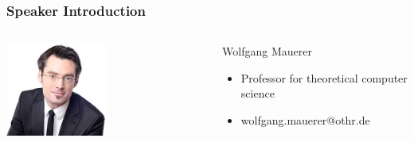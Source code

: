 \documentclass{beamer}
\begin{document}
	\begin{frame}
	\frametitle{Speaker Introduction}
	\begin{minipage}[c]{1.0\linewidth}
		\begin{columns}
		\begin{column}{0.35\textwidth}
			\begin{center}
     		\includegraphics[width=0.5\textwidth]{pics/speakers_mauerer.jpeg}
			\end{center}
		\end{column}
		\begin{column}{0.7\textwidth}
		\begin{block}{Wolfgang Mauerer}
			\begin{itemize}
				\item Professor for theoretical computer science
				\item wolfgang.mauerer@othr.de
			\end{itemize}
		\end{block}
		\end{column}
		\end{columns}


\end{minipage}
\end{frame}
\end{document}

